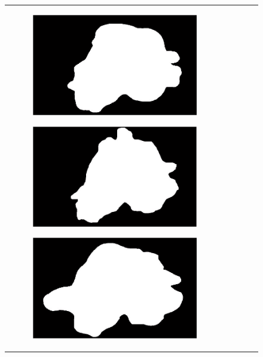 \documentclass[a4paper, 10pt, conference]{ieeeconf}        %
\begin{document}
\begin{figure}[ht!]
\begin{tabular}{c c c c c}
\begin{subfigure}{0.2\textwidth}
       \end{subfigure}
       \begin{subfigure}{0.2\textwidth}
       \includegraphics[scale=0.2]{expert_1GroundTrue_08.JPG}
       \end{subfigure}
       \begin{subfigure}{0.2\textwidth}
        \includegraphics[scale=0.2]{expert_2GroundTrue_08.JPG}
        \end{subfigure} 
       \begin{subfigure}{0.2\textwidth}
        \includegraphics[scale=0.2]{expert_3GroundTrue_08.JPG}

\end{subfigure}
\end{tabular}
\end{figure}
\end{document}
